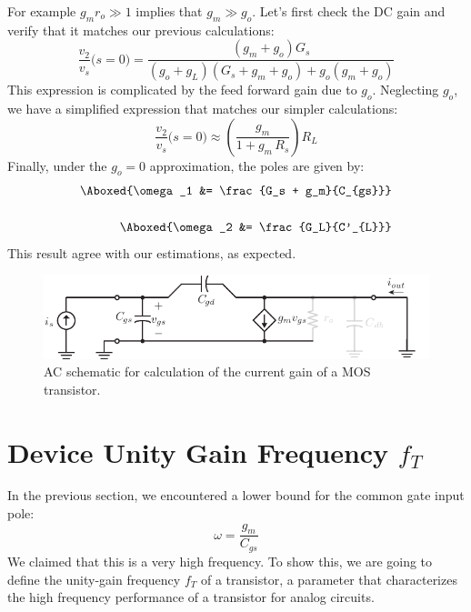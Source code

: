 For example $g_m r_o \gg 1$ implies that $g_m \gg g_o$.  Let's first check the DC gain and verify that it matches our previous calculations:
    \begin{equation}
        \frac{v_2}{v_s}\big(s = 0\big) = \frac{(g_m + g_o)G_s}{(g_o + g_L)(G_s + g_m + g_o) + g_o (g_m + g_o)}
    \end{equation}
This expression is complicated by the feed forward gain due to $g_o$.  Neglecting $g_o$, we have a simplified expression that matches our simpler calculations:
    \begin{equation}
        \frac{v_2}{v_s}\big(s = 0\big) \approx \left(\frac{g_m}{1 + g_m\,R_s}\right)R_L
    \end{equation}
Finally, under the $g_o = 0$ approximation, the poles are given by:
    \begin{align}
        \Aboxed{\omega_1 &= \frac{G_s + g_m}{C_{gs}}}\\[0.5cm]
        \Aboxed{\omega_2 &= \frac{G_L}{C'_{L}}}
    \end{align}
This result agree with our estimations, as expected.
\newpage
\begin{figure}[t]
\centering
\includegraphics[scale=1.25]{hybrid_pi_ft}
\caption{AC schematic for calculation of the current gain of a MOS transistor.}
\label{fig:hybrid_pi_ft}
\end{figure}
\section{Device Unity Gain Frequency \texorpdfstring{$f_T$}{}}
In the previous section, we encountered a lower bound for the common gate input pole:
    \begin{equation}
        \omega = \frac{g_m}{C_{gs}}
    \end{equation}
We claimed that this is a very high frequency.  To show this, we are going to define the unity-gain frequency $f_T$ of a transistor, a parameter that characterizes the high frequency performance of a transistor for analog circuits.

